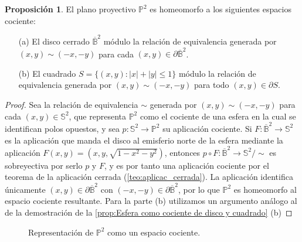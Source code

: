 \documentclass[10pt]{report}
\theoremstyle{definition}
\newtheorem{prop}[defin]{Proposición}
\begin{document}
\begin{prop}%
\label{prop:proyectivo_cociente_cuadrado}
El plano proyectivo $\mathbb{P}^2$ es homeomorfo a los siguientes espacios cociente:
\begin{itemize}
\item[(a)] El disco cerrado $\overline{\mathbb{B}}^2$ módulo la relación de equivalencia generada por $(x,y) \sim (-x,-y)$ para cada $(x,y)\in \partial \overline{\mathbb{B}}^2$.
\item[(b)] El cuadrado $S=\{(x,y):|x|+|y|\leq 1\} $ módulo la relación de equivalencia generada por $(x,y)\sim (-x,-y) $ para todo $(x,y)\in \partial S$.
\end{itemize}
\end{prop}
\begin{proof}
Sea la relación de equivalencia $\sim$ generada por $(x,y) \sim (-x,-y)$ para cada $(x,y)\in \mathbb{S}^2$, que representa $\mathbb{P}^2$ como el cociente de una esfera en la cual se identifican polos opuestos, y sea $p:\mathbb{S}^2 \to \mathbb{P}^2$ su aplicación cociente. %
Si $F:\overline{\mathbb{B}}^2 \to \mathbb{S}^2$ es la aplicación que manda el disco al emisferio norte de la esfera mediante la aplicación $F(x,y)=(x,y,\sqrt{1-x^2-y^2})$, entonces $p\circ F:\overline{\mathbb{B}}^2 \to \mathbb{S}^2/\sim$ es sobreyectiva por serlo $p$ y $F$, y es por tanto una aplicación cociente por el teorema de la aplicación cerrada (\autoref{teo:aplicac_cerrada}). La aplicación identifica únicamente $(x,y)\in \partial \overline{\mathbb{B}}^2$ con $(-x,-y)\in \partial \overline{\mathbb{B}}^2$, por lo que $\mathbb{P}^2$ es homeomorfo al espacio cociente resultante.
Para la parte (b) utilizamos un argumento análogo al de la demostración de la \autoref{prop:Esfera como cociente de disco y cuadrado} (b) 
\end{proof}


\begin{figure}[]%
\begin{center}
\caption{Representación de $\mathbb{P}^2$ como un espacio cociente.\label{fig:plano_proyectivo_cuadrado}}
\end{center}
\end{figure}
\end{document}
